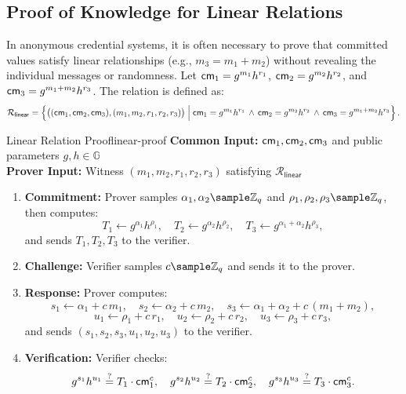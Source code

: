 \newpage
\subsection{Proof of Knowledge for Linear Relations}\label{pok-linear}

In anonymous credential systems, it is often necessary to prove that committed values satisfy linear relationships (e.g., \(m_3 = m_1 + m_2\)) without revealing the individual messages or randomness. Let \(\mathsf{cm}_1 = g^{m_1}h^{r_1}\), \(\mathsf{cm}_2 = g^{m_2}h^{r_2}\), and \(\mathsf{cm}_3 = g^{m_1 + m_2}h^{r_3}\). The relation is defined as:
\[
\mathcal{R}_{\mathsf{linear}} = \left\{ 
    \big((\mathsf{cm}_1, \mathsf{cm}_2, \mathsf{cm}_3), (m_1, m_2, r_1, r_2, r_3)\big) \; 
    \Big| \; 
    \mathsf{cm}_1 = g^{m_1}h^{r_1} \, \land \, \mathsf{cm}_2 = g^{m_2}h^{r_2} \, \land \, \mathsf{cm}_3 = g^{m_1 + m_2}h^{r_3} 
\right\}.
\]

\begin{protocol}{Linear Relation Proof}{linear-proof}
\textbf{Common Input:} \(\mathsf{cm}_1, \mathsf{cm}_2, \mathsf{cm}_3\) and public parameters \(g, h \in \mathbb{G}\)\\
\textbf{Prover Input:} Witness \((m_1, m_2, r_1, r_2, r_3)\) satisfying \(\mathcal{R}_{\mathsf{linear}}\)
\begin{enumerate}
    \item \textbf{Commitment:} Prover samples \(\alpha_1, \alpha_2 \sample \Z_q\) and \(\rho_1, \rho_2, \rho_3 \sample \Z_q\), then computes:
    \[
    T_1 \gets g^{\alpha_1}h^{\rho_1}, \quad T_2 \gets g^{\alpha_2}h^{\rho_2}, \quad T_3 \gets g^{\alpha_1 + \alpha_2}h^{\rho_3},
    \]
    and sends \(T_1, T_2, T_3\) to the verifier.
    
    \item \textbf{Challenge:} Verifier samples \(c \sample \Z_q\) and sends it to the prover.
    
    \item \textbf{Response:} Prover computes:
    \[
    s_1 \gets \alpha_1 + c\,m_1, \quad s_2 \gets \alpha_2 + c\,m_2, \quad s_3 \gets \alpha_1 + \alpha_2 + c\,(m_1 + m_2),
    \]
    \[
    u_1 \gets \rho_1 + c\,r_1, \quad u_2 \gets \rho_2 + c\,r_2, \quad u_3 \gets \rho_3 + c\,r_3,
    \]
    and sends \((s_1, s_2, s_3, u_1, u_2, u_3)\) to the verifier.
    
    \item \textbf{Verification:} Verifier checks:
    \[
    g^{s_1}h^{u_1} \stackrel{?}{=} T_1 \cdot \mathsf{cm}_1^c, \quad 
    g^{s_2}h^{u_2} \stackrel{?}{=} T_2 \cdot \mathsf{cm}_2^c, \quad 
    g^{s_3}h^{u_3} \stackrel{?}{=} T_3 \cdot \mathsf{cm}_3^c.
    \]
\end{enumerate}
\end{protocol}

